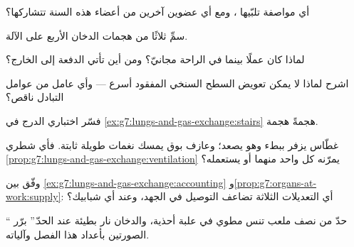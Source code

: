 \begin{exercise}[$\star$]\label{exo:g7:lungs-and-gas-exchange:5}
أي مواصفة تلبّيها ، ومع أي عضوين آخرين من أعضاء هذه السنة
تتشاركها؟
\end{exercise}

\begin{exercise}[$\star$]\label{exo:g7:lungs-and-gas-exchange:6}
سمِّ ثلاثًا من هجمات الدخان الأربع على الآلة.
\end{exercise}

\begin{exercise}[$\star\star$]\label{exo:g7:lungs-and-gas-exchange:7}
لماذا كان  عملًا بينما  في الراحة مجانيّ؟ ومن أين تأتي
الدفعة إلى الخارج؟
\end{exercise}

\begin{exercise}[$\star\star$]\label{exo:g7:lungs-and-gas-exchange:8}
اشرح لماذا لا يمكن تعويض السطح السنخي المفقود  أسرع --- وأي
عامل من عوامل التبادل ناقص؟
\end{exercise}

\begin{exercise}[$\star\star$]\label{exo:g7:lungs-and-gas-exchange:9}
فسّر اختباري الدرج في
\cref{ex:g7:lungs-and-gas-exchange:stairs} هجمةً هجمة.
\end{exercise}

\begin{exercise}[$\star\star$]\label{exo:g7:lungs-and-gas-exchange:10}
غطّاس يزفر ببطء وهو يصعد؛ وعازف بوق يمسك نغمات طويلة ثابتة. فأي
شطري \cref{prop:g7:lungs-and-gas-exchange:ventilation} يمرّنه كل
واحد منهما أو يستعمله؟
\end{exercise}

\begin{exercise}[$\star\star$]\label{exo:g7:lungs-and-gas-exchange:11}
وفّق بين \cref{ex:g7:lungs-and-gas-exchange:accounting}
و\cref{prop:g7:organs-at-work:supply}: أي التعديلات الثلاثة تضاعف
التوصيل في الجهد، وعند أي شبابيك؟
\end{exercise}

\begin{exercise}[$\star\star\star$]\label{exo:g7:lungs-and-gas-exchange:12}
`` حدّ من نصف ملعب تنس مطوي في علبة أحذية، والدخان نار بطيئة
عند الحدّ.'' برّر الصورتين بأعداد هذا الفصل وآلياته.
\end{exercise}

